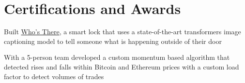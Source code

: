 \documentclass[]{resume-template}
\begin{document}
\begin{minipage}[t]{0.66\textwidth}
        \sectionsep




        \section{Certifications and Awards}\label{sec:certifications-and-awards}
        \begin{tightemize}
            \item Built \href{https://devpost.com/software/who-s-there-wkdheg}{Who's There}, a smart lock that uses a state-of-the-art transformers image captioning model to tell someone what is happening outside of their door
        \end{tightemize}
        \sectionsep{}
        \begin{tightemize}
            \item With a 5-person team developed a custom momentum based algorithm that detected rises and falls within
            Bitcoin and Ethereum prices with a custom load factor to detect volumes of trades
        \end{tightemize}
        \sectionsep{}


\end{minipage}
\end{document}
